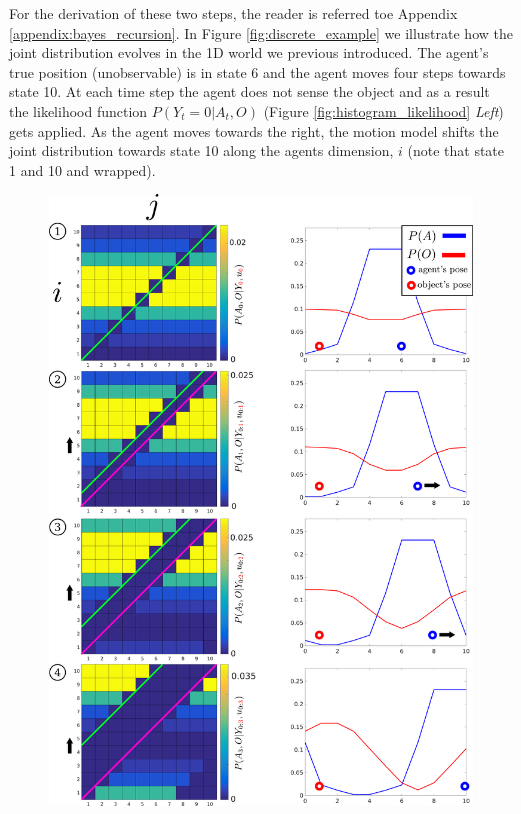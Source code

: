 For the derivation of these  two steps, the reader is referred toe Appendix \ref{appendix:bayes_recursion}.
In Figure \ref{fig:discrete_example} we illustrate how the joint distribution evolves in the 1D world 
we previous introduced. The agent's true position (unobservable) is in state 6 and the agent moves four steps towards state 10. At each time 
step the agent does not sense the object and as a result the likelihood function  $P(Y_t=0|A_t,O)$ (Figure \ref{fig:histogram_likelihood} \textit{Left})
gets applied. As the agent moves towards the right, the motion model shifts the joint distribution towards state 10 along the agents 
dimension, $i$ (note that state 1 and 10 and wrapped).

\begin{figure}
 \centering
  \includegraphics[width=\textwidth]{./ch5-MLMF/Figures/explenation/hist_motion.pdf}

\end{figure}
